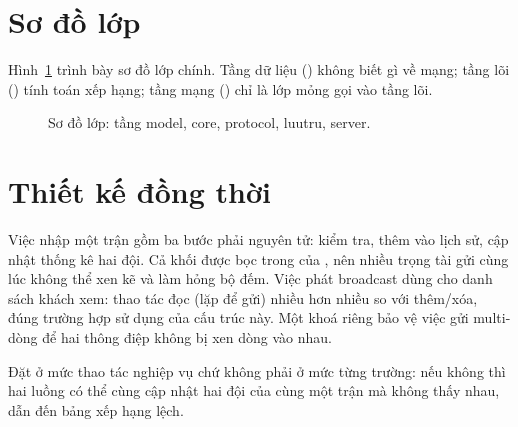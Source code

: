 \section{Sơ đồ lớp}

Hình~\ref{fig:lop} trình bày sơ đồ lớp chính. Tầng dữ liệu () không
biết gì về mạng; tầng lõi () tính toán xếp hạng; tầng mạng
() chỉ là lớp mỏng gọi vào tầng lõi.

\begin{figure}[H]
\centering
{}
\caption{Sơ đồ lớp: tầng model, core, protocol, luutru, server.}
\label{fig:lop}
\end{figure}

\section{Thiết kế đồng thời}

Việc nhập một trận gồm ba bước phải nguyên tử: kiểm tra, thêm vào lịch sử, cập
nhật thống kê hai đội. Cả khối được bọc trong  của
, nên nhiều trọng tài gửi cùng lúc không thể xen kẽ và làm
hỏng bộ đếm. Việc phát broadcast dùng  cho danh sách
khách xem: thao tác đọc (lặp để gửi) nhiều hơn nhiều so với thêm/xóa, đúng trường
hợp sử dụng của cấu trúc này. Một khoá riêng  bảo vệ việc gửi
multi-dòng để hai thông điệp không bị xen dòng vào nhau.

\begin{luuy}
Đặt  ở mức thao tác nghiệp vụ chứ không phải ở mức từng
trường: nếu không thì hai luồng có thể cùng cập nhật hai đội của cùng một trận
mà không thấy nhau, dẫn đến bảng xếp hạng lệch.
\end{luuy}
